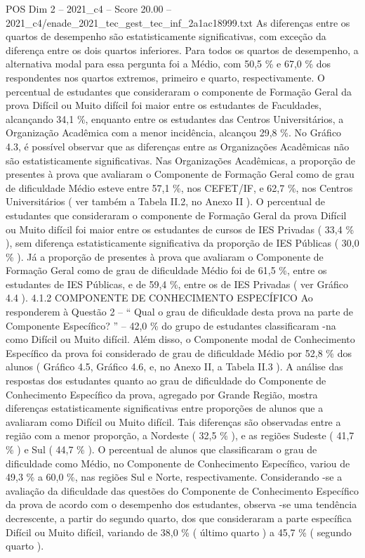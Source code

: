 \begin{textsample}{POS Dim 2 – 2021\_c4 – Score 20.00 – 2021\_c4/enade\_2021\_tec\_gest\_tec\_inf\_2a1ac18999.txt}
As diferenças entre os quartos de desempenho são estatisticamente significativas, com exceção da diferença entre os dois quartos inferiores.
Para todos os quartos de desempenho, a alternativa modal para essa pergunta foi a Médio, com 50,5 \% e 67,0 \% dos respondentes nos quartos extremos, primeiro e quarto, respectivamente.
O percentual de estudantes que consideraram o componente de Formação Geral da prova Difícil ou Muito difícil foi maior entre os estudantes de Faculdades, alcançando 34,1 \%, enquanto entre os estudantes das Centros Universitários, a Organização Acadêmica com a menor incidência, alcançou 29,8 \%.
No Gráfico 4.3, é possível observar que as diferenças entre as Organizações Acadêmicas não são estatisticamente significativas.
Nas Organizações Acadêmicas, a proporção de presentes à prova que avaliaram o Componente de Formação Geral como de grau de dificuldade Médio esteve entre 57,1 \%, nos CEFET/IF, e 62,7 \%, nos Centros Universitários ( ver também a Tabela II.2, no Anexo II ).
O percentual de estudantes que consideraram o componente de Formação Geral da prova Difícil ou Muito difícil foi maior entre os estudantes de cursos de IES Privadas ( 33,4 \% ), sem diferença estatisticamente significativa da proporção de IES Públicas ( 30,0 \% ).
Já a proporção de presentes à prova que avaliaram o Componente de Formação Geral como de grau de dificuldade Médio foi de 61,5 \%, entre os estudantes de IES Públicas, e de 59,4 \%, entre os de IES Privadas ( ver Gráfico 4.4 ). 4.1.2 COMPONENTE DE CONHECIMENTO ESPECÍFICO Ao responderem à Questão 2 – “ Qual o grau de dificuldade desta prova na parte de Componente Específico? ” – 42,0 \% do grupo de estudantes classificaram -na como Difícil ou Muito difícil.
Além disso, o Componente modal de Conhecimento Específico da prova foi considerado de grau de dificuldade Médio por 52,8 \% dos alunos ( Gráfico 4.5, Gráfico 4.6, e, no Anexo II, a Tabela II.3 ).
A análise das respostas dos estudantes quanto ao grau de dificuldade do Componente de Conhecimento Específico da prova, agregado por Grande Região, mostra diferenças estatisticamente significativas entre proporções de alunos que a avaliaram como Difícil ou Muito difícil.
Tais diferenças são observadas entre a região com a menor proporção, a Nordeste ( 32,5 \% ), e as regiões Sudeste ( 41,7 \% ) e Sul ( 44,7 \% ).
O percentual de alunos que classificaram o grau de dificuldade como Médio, no Componente de Conhecimento Específico, variou de 49,3 \% a 60,0 \%, nas regiões Sul e Norte, respectivamente.
Considerando -se a avaliação da dificuldade das questões do Componente de Conhecimento Específico da prova de acordo com o desempenho dos estudantes, observa -se uma tendência decrescente, a partir do segundo quarto, dos que consideraram a parte específica Difícil ou Muito difícil, variando de 38,0 \% ( último quarto ) a 45,7 \% ( segundo quarto ).

\end{textsample}
